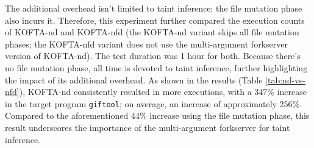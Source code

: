 \iffalse
The additional overhead isn't limited to taint inference; the file mutation phase also incurs it. Therefore, this experiment further compared the execution counts of KOFTA-nd and KOFTA-nfd (the KOFTA-nd variant skips all file mutation phases; the KOFTA-nfd variant does not use the multi-argument forkserver version of KOFTA-nd). The test duration was 1 hour for both. Because there's no file mutation phase, all time is devoted to taint inference, further highlighting the impact of its additional overhead. As shown in the results (Table \ref{tab:nd-vs-nfd}), KOFTA-nd consistently resulted in more executions, with a 347\% increase in the target program \texttt{giftool}; on average, an increase of approximately 256\%. Compared to the aforementioned 44\% increase using the file mutation phase, this result underscores the importance of the multi-argument forkserver for taint inference.



